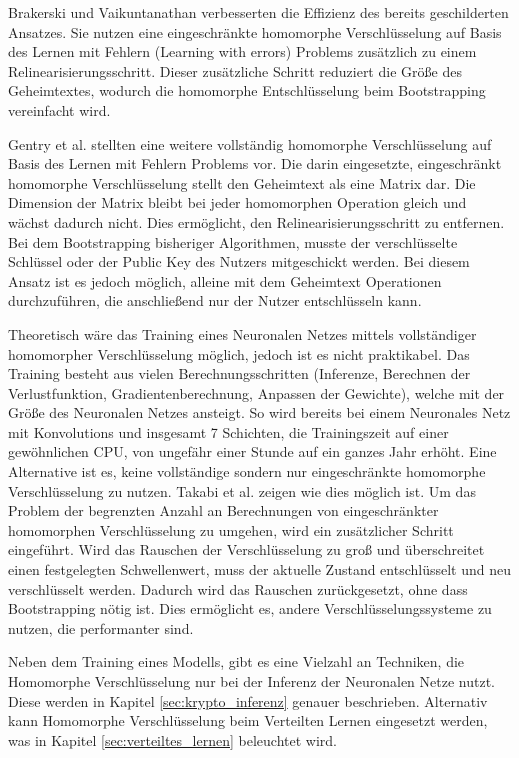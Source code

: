 Brakerski und Vaikuntanathan \cite{P-101} verbesserten die Effizienz des bereits geschilderten Ansatzes.
Sie nutzen eine eingeschränkte homomorphe Verschlüsselung auf Basis des Lernen mit Fehlern (Learning with errors) Problems zusätzlich zu einem Relinearisierungsschritt.
Dieser zusätzliche Schritt reduziert die Größe des Geheimtextes, wodurch die homomorphe Entschlüsselung beim Bootstrapping vereinfacht wird.

Gentry et al. \cite{P-102} stellten eine weitere vollständig homomorphe Verschlüsselung auf Basis des Lernen mit Fehlern Problems vor.
Die darin eingesetzte, eingeschränkt homomorphe Verschlüsselung stellt den Geheimtext als eine Matrix dar.
Die Dimension der Matrix bleibt bei jeder homomorphen Operation gleich und wächst dadurch nicht.
Dies ermöglicht, den Relinearisierungsschritt zu entfernen.
Bei dem Bootstrapping bisheriger Algorithmen, musste der verschlüsselte Schlüssel oder der Public Key des Nutzers mitgeschickt werden.
Bei diesem Ansatz ist es jedoch möglich, alleine mit dem Geheimtext Operationen durchzuführen, die anschließend nur der Nutzer entschlüsseln kann.


Theoretisch wäre das Training eines Neuronalen Netzes mittels vollständiger homomorpher Verschlüsselung möglich, jedoch ist es nicht praktikabel. 
Das Training besteht aus vielen Berechnungsschritten (Inferenze, Berechnen der Verlustfunktion, Gradientenberechnung, Anpassen der Gewichte), welche mit der Größe des Neuronalen Netzes ansteigt.
So wird bereits bei einem Neuronales Netz mit Konvolutions und insgesamt 7 Schichten, die Trainingszeit auf einer gewöhnlichen CPU, von ungefähr einer Stunde auf ein ganzes Jahr erhöht\cite{P-103}.
Eine Alternative ist es, keine vollständige sondern nur eingeschränkte homomorphe Verschlüsselung zu nutzen.
Takabi et al. \cite{P-104} zeigen wie dies möglich ist.
Um das Problem der begrenzten Anzahl an Berechnungen von eingeschränkter homomorphen Verschlüsselung zu umgehen, wird ein zusätzlicher Schritt eingeführt. 
Wird das Rauschen der Verschlüsselung zu groß und überschreitet einen festgelegten Schwellenwert, muss der aktuelle Zustand entschlüsselt und neu verschlüsselt werden.
Dadurch wird das Rauschen zurückgesetzt, ohne dass Bootstrapping nötig ist.
Dies ermöglicht es, andere Verschlüsselungssysteme zu nutzen, die performanter sind.


Neben dem Training eines Modells, gibt es eine Vielzahl an Techniken, die Homomorphe Verschlüsselung nur bei der Inferenz der Neuronalen Netze nutzt. 
Diese werden in Kapitel \ref{sec:krypto_inferenz} genauer beschrieben.
Alternativ kann Homomorphe Verschlüsselung beim Verteilten Lernen eingesetzt werden, was in Kapitel \ref{sec:verteiltes_lernen} beleuchtet wird. 




